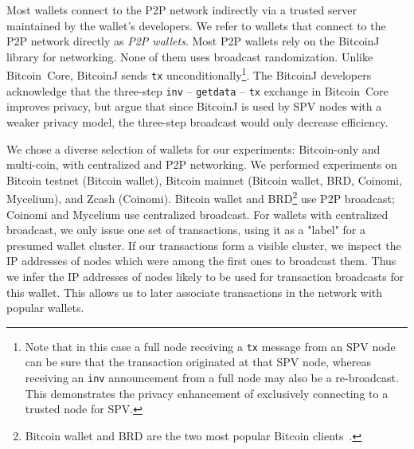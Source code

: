 Most wallets connect to the P2P network indirectly via a trusted server maintained by the wallet's developers.
We refer to wallets that connect to the P2P network directly as \textit{P2P wallets}.
Most P2P wallets rely on the BitcoinJ library for networking.
None of them uses broadcast randomization.
Unlike Bitcoin~Core, BitcoinJ sends \texttt{tx} unconditionally\footnote{Note that in this case a full node receiving a \texttt{tx} message from an SPV node can be sure that the transaction originated at that SPV node, whereas receiving an \texttt{inv} announcement from a full node may also be a re-broadcast. This demonstrates the privacy enhancement of exclusively connecting to a trusted node for SPV.}.
The BitcoinJ developers acknowledge that the three-step \texttt{inv} -- \texttt{getdata} -- \texttt{tx} exchange in Bitcoin~Core improves privacy, but argue that since BitcoinJ is used by SPV nodes with a weaker privacy model, the three-step broadcast would only decrease efficiency.

We chose a diverse selection of wallets for our experiments: Bitcoin-only and multi-coin, with centralized and P2P networking.
We performed experiments on Bitcoin testnet (Bitcoin wallet), Bitcoin mainnet (Bitcoin wallet, BRD, Coinomi, Mycelium), and Zcash (Coinomi).
Bitcoin wallet and BRD\footnote{Bitcoin wallet and BRD are the two most popular Bitcoin clients~\cite{Wang2017}.} use P2P broadcast; Coinomi and Mycelium use centralized broadcast.
For wallets with centralized broadcast, we only issue one set of transactions, using it as a "label" for a presumed wallet cluster.
If our transactions form a visible cluster, we inspect the IP addresses of nodes which were among the first ones to broadcast them.
Thus we infer the IP addresses of nodes likely to be used for transaction broadcasts for this wallet.
This allows us to later associate transactions in the network with popular wallets.

